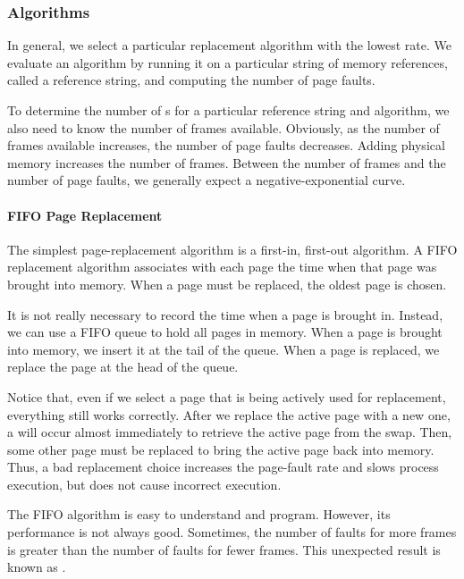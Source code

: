\subsubsection{Algorithms}\label{subsubsec:Page_Replacement_Algorithms}
In general, we select a particular replacement algorithm with the lowest  rate.
We evaluate an algorithm by running it on a particular string of memory references, called a reference string, and computing the number of page faults.

To determine the number of s for a particular reference string and  algorithm, we also need to know the number of frames available.
Obviously, as the number of frames available increases, the number of page faults decreases.
Adding physical memory increases the number of frames.
Between the number of frames and the number of page faults, we generally expect a negative-exponential curve.

\paragraph{FIFO Page Replacement}\label{par:FIFO_Page_Replacement}
The simplest page-replacement algorithm is a first-in, first-out algorithm.
A FIFO replacement algorithm associates with each page the time when that page was brought into memory.
When a page must be replaced, the oldest page is chosen.

It is not really necessary to record the time when a page is brought in.
Instead, we can use a FIFO queue to hold all pages in memory.
When a page is brought into memory, we insert it at the tail of the queue.
When a page is replaced, we replace the page at the head of the queue.

Notice that, even if we select a page that is being actively used for replacement, everything still works correctly.
After we replace the active page with a new one, a  will occur almost immediately to retrieve the active page from the swap.
Then, some other page must be replaced to bring the active page back into memory.
Thus, a bad replacement choice increases the page-fault rate and slows process execution, but does not cause incorrect execution.

The FIFO  algorithm is easy to understand and program.
However, its performance is not always good.
Sometimes, the number of faults for more frames is greater than the number of faults for fewer frames.
This unexpected result is known as .

